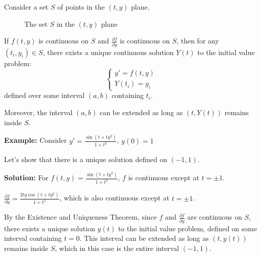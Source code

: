 \documentclass{article}
\begin{document}
Consider a set $S$ of points in the $(t,y)$ plane.

\begin{figure}[h]
    \centering
    \caption{The set $S$ in the $(t,y)$ plane}
    \label{fig:set_S}
\end{figure}

If $f(t,y)$ is continuous on $S$ and $\frac{\partial f}{\partial y}$ is continuous on $S$, then for any $(t_i, y_i) \in S$, there exists a unique continuous solution $Y(t)$ to the initial value problem:
\[
\begin{cases}
y' = f(t,y) \\
Y(t_i) = y_i
\end{cases}
\]
defined over some interval $(a,b)$ containing $t_i$.

Moreover, the interval $(a,b)$ can be extended as long as $(t, Y(t))$ remains inside $S$.

\textbf{Example:} Consider $y' = \frac{\sin(t+ty^2)}{1+t^2}$, $y(0) = 1$

Let's show that there is a unique solution defined on $(-1, 1)$.

\textbf{Solution:} 
For $f(t, y) = \frac{\sin(t+ty^2)}{1+t^2}$, $f$ is continuous except at $t = \pm 1$.

$\frac{\partial f}{\partial y} = \frac{2ty\cos(t+ty^2)}{1+t^2}$, which is also continuous except at $t = \pm 1$.

By the Existence and Uniqueness Theorem, since $f$ and $\frac{\partial f}{\partial y}$ are continuous on $S$, there exists a unique solution $y(t)$ to the initial value problem, defined on some interval containing $t=0$. This interval can be extended as long as $(t,y(t))$ remains inside $S$, which in this case is the entire interval $(-1,1)$.
\end{document}
